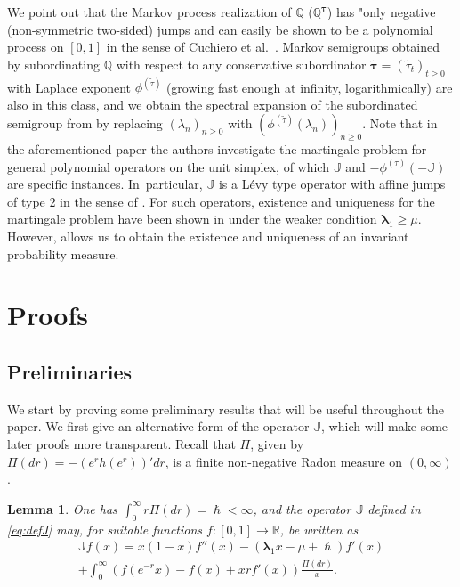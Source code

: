 \documentclass[10pt]{amsart}
\theoremstyle{plain}
\newtheorem{lemma}[theorem]{Lemma}
\theoremstyle{definition}
\newcommand{\R}{\mathbb{R}}
\newcommand{\J}{\mathds{Q}}
\newcommand{\calJ}{\mathds{J}}
\newcommand{\lam}{{\bm{\lambda}_1}}
\let\h\hslash
\let\mo\mu
\begin{document}
We point out that the Markov process realization of $\J$ (\resp $\J^{\bm{\tau}}$) has "only negative (\resp non-symmetric two-sided) jumps and can easily be shown to be a polynomial process on $[0,1]$ in the sense of Cuchiero et al.~\cite{cuchiero2018}. Markov semigroups obtained by subordinating $\J$ with respect to any conservative subordinator $\widetilde{\bm{\tau}} = (\widetilde{\tau}_t)_{t \geq 0}$ with Laplace exponent $\phi^{(\widetilde{\tau})}$ (growing fast enough at infinity, \eg logarithmically) are also in this class, and we obtain the spectral expansion of the subordinated semigroup
from  by replacing $(\lambda_n)_{n \geq 0}$ with $(\phi^{(\widetilde{\tau})}(\lambda_n))_{n \geq 0}$. Note that in the aforementioned paper the authors investigate the martingale problem for general polynomial operators on the unit simplex, of which $\calJ$ and $-\phi^{(\tau)}(-\calJ)$ are specific instances. In~particular, $\calJ$ is a Lévy type operator with affine jumps of type 2 in the sense of \cite{cuchiero2018}. For such operators, existence and uniqueness for the martingale problem have been shown in \cite{cuchiero2018} under the weaker condition $\lam \geq \mo$. However,  allows us to obtain the existence and uniqueness of an invariant probability measure.

\section{Proofs} \label{sec:proofs}

\subsection{Preliminaries}
We start by proving some preliminary results that will be useful throughout the paper. We first give an alternative form of the operator $\calJ$, which will make some later proofs more transparent.
Recall that $\Pi$, given by $\Pi(dr) = -(e^rh(e^r))'dr$, is a finite non-negative Radon measure on $(0,\infty)$.

\begin{lemma}
\label{lem:rewriting-stuff}
One has $\int_0^\infty r\Pi(dr) = \h < \infty$, and the operator $\calJ$ defined in \eqref{eq:defJ} may,
for suitable functions $f \colon [0,1] \to \R$, be written as
\begin{multline*}
\calJ f(x) = x(1-x)f''(x) - (\lam x-\mo+\h)f'(x)\\
+ \int_{0}^{\infty} \left(f(e^{-r}x)-f(x)+xrf'(x)\right)\frac{\Pi(dr)}{x}.
\end{multline*}
\end{lemma}
\end{document}
